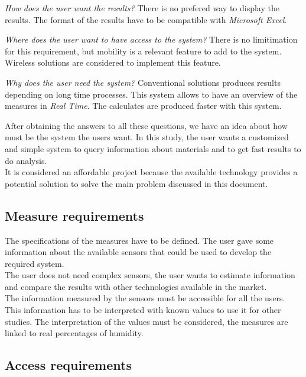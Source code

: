\item \textit{How does the user want the results?} There is no prefered way to display the results. The format of the results have to be compatible with \textit{Microsoft Excel}.

\item \textit{Where does the user want to have access to the system?} There is no limitimation for this requirement, but mobility is a relevant feature to add to the system. Wireless solutions are considered to implement this feature.

\item \textit{Why does the user need the system?} Conventional solutions produces results depending on long time processes. This system allows to have an overview of the measures in \textit{Real Time}. The calculates are produced faster with this system.

After obtaining the answers to all these questions, we have an idea about how must be the system the users want. In this study, the user wants a customized and simple system to query information about materials and to get fast results to do analysis.\\

It is considered an affordable project because the available technology provides a potential solution to solve the main problem discussed in this document.

\subsection{Measure requirements}

The specifications of the measures have to be defined. The user gave some information about the available sensors that could be used to develop the required system.\\

The user does not need complex sensors, the user wants to estimate information and compare the results with other technologies available in the market.\\

The information measured by the sensors must be accessible for all the users. This information has to be interpreted with known values to use it for other studies. The interpretation of the values must be considered, the measures are linked to real percentages of humidity.

\subsection{Access requirements}

